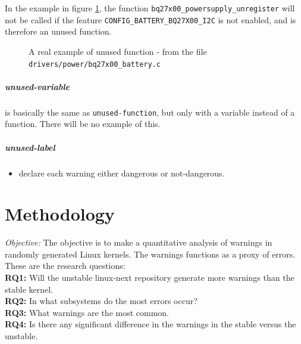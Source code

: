 \documentclass[a4paper,11pt]{report}
\newcommand{\figa}{
    \begin{figure}[!htpb]
    \centering
}
\newcommand{\figb}[2]{
    \caption{#1}
    \label{#2}
    \end{figure}
}
\begin{document}
In the example in figure \ref{lst:unusedfuncreal}, the function 
\texttt{bq27x00\_powersupply\_unregister} will not be called if the feature 
\texttt{CONFIG\_BATTERY\_BQ27X00\_I2C} is not enabled, and is therefore an 
unused function.

\figa
    
\figb{A real example of unused function - from the file 
    \texttt{drivers/power/bq27x00\_battery.c}}{lst:unusedfuncreal}


            \paragraph{unused-variable}
is basically the same as \texttt{unused-function}, but only with a variable 
instead of a function. There will be no example of this.


            \paragraph{unused-label}


\begin{itemize}
    \item declare each warning either dangerous or not-dangerous.
\end{itemize}


\newpage
\chapter{Methodology}

\emph{Objective:}
The objective is to make a quantitative analysis of warnings in randomly 
generated Linux kernels. The warnings functions as a proxy of errors.
These are the research questions:
\\

\textbf{RQ1:} Will the unstable linux-next repository generate more warnings 
than the stable kernel.
\\

\textbf{RQ2:} In what subsystems do the most errors occur?
\\

\textbf{RQ3:} What warnings are the most common.
\\

\textbf{RQ4:} Is there any significant difference in the warnings in the 
stable versus the unstable.
\\
\end{document}
